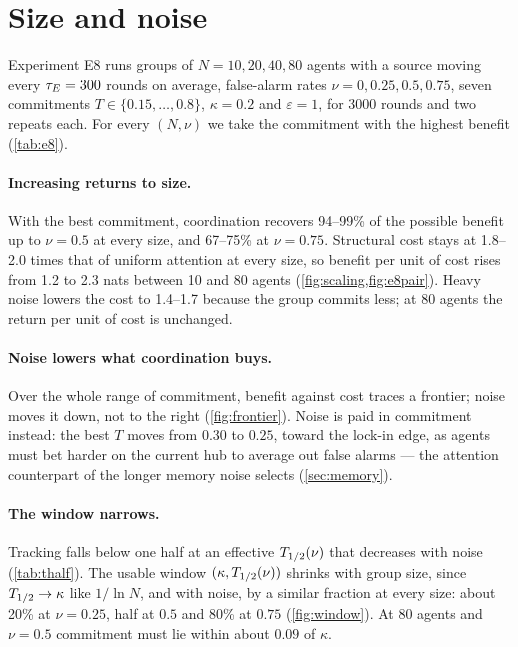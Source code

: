 \section{Size and noise}\label{sec:scaling}

Experiment E8 runs groups of $N=10,20,40,80$ agents with a source moving every $\tau_E=300$ rounds on average, false-alarm
rates $\nu=0,0.25,0.5,0.75$, seven commitments $T\in\{0.15,\dots,0.8\}$, $\kappa=0.2$ and $\varepsilon=1$, for 3000 rounds
and two repeats each. For every $(N,\nu)$ we take the commitment with the highest benefit (\cref{tab:e8}).


\paragraph{Increasing returns to size.} With the best commitment, coordination recovers 94--99\% of the possible benefit
up to $\nu=0.5$ at every size, and 67--75\% at $\nu=0.75$. Structural cost stays at 1.8--2.0 times that of uniform
attention at every size, so benefit per unit of cost rises from 1.2 to 2.3 nats between 10 and 80 agents
(\cref{fig:scaling,fig:e8pair}). Heavy noise lowers the cost to 1.4--1.7 because the group commits less; at 80 agents the
return per unit of cost is unchanged.


\paragraph{Noise lowers what coordination buys.} Over the whole range of commitment, benefit against cost traces a
frontier; noise moves it down, not to the right (\cref{fig:frontier}). Noise is paid in commitment instead: the best
$T$ moves from $0.30$ to $0.25$, toward the lock-in edge, as agents must bet harder on the current hub to average out
false alarms --- the attention counterpart of the longer memory noise selects (\cref{sec:memory}).


\paragraph{The window narrows.} Tracking falls below one half at an effective $T_{1/2}(\nu)$ that decreases with noise
(\cref{tab:thalf}). The usable window $(\kappa,T_{1/2}(\nu))$ shrinks with group size, since $T_{1/2}\to\kappa$ like
$1/\ln N$, and with noise, by a similar fraction at every size: about 20\% at $\nu=0.25$, half at $0.5$ and 80\% at
$0.75$ (\cref{fig:window}). At 80 agents and $\nu=0.5$ commitment must lie within about $0.09$ of $\kappa$.

